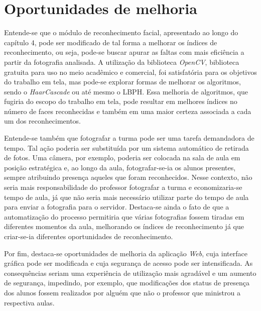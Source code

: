 \section{Oportunidades de melhoria}
Entende-se que o módulo de reconhecimento facial, apresentado ao longo do capítulo 4, pode ser modificado de tal forma a melhorar os índices de reconhecimento, ou seja, pode-se buscar apurar as faltas com mais eficiência a partir da fotografia analisada. A utilização da biblioteca \textit{OpenCV}, biblioteca gratuita para uso no meio acadêmico e comercial, foi satisfatória para os objetivos do trabalho em tela, mas pode-se explorar formas de melhorar os algoritmos, sendo o \textit{HaarCascade} ou até mesmo o LBPH. Essa melhoria de algoritmos, que fugiria do escopo do trabalho em tela, pode resultar em melhores índices no número de faces reconhecidas e também em uma maior certeza associada a cada um dos reconhecimentos.

Entende-se também que fotografar a turma pode ser uma tarefa demandadora de tempo. Tal ação poderia ser substituída por um sistema automático de retirada de fotos. Uma câmera, por exemplo, poderia ser colocada na sala de aula em posição estratégica e, ao longo da aula, fotografar-se-ia os alunos presentes, sempre atribuindo presença aqueles que foram reconhecidos. Nesse contexto, não seria mais responsabilidade do professor fotografar a turma e economizaria-se tempo de aula, já que não seria mais necessário utilizar parte do tempo de aula para enviar a fotografia para o servidor. Destaca-se ainda o fato de que a automatização do processo permitiria que várias fotografias fossem tiradas em diferentes momentos da aula, melhorando os índices de reconhecimento já que criar-se-ia diferentes oportunidades de reconhecimento.

Por fim, destaca-se oportunidades de melhoria da aplicação \textit{Web}, cuja interface gráfica pode ser modificada e cuja segurança de acesso pode ser intensificada. As consequências seriam uma experiência de utilização mais agradável e um aumento de segurança, impedindo, por exemplo, que modificações dos status de presença dos alunos fossem realizados por alguém que não o professor que ministrou a respectiva aulas.




